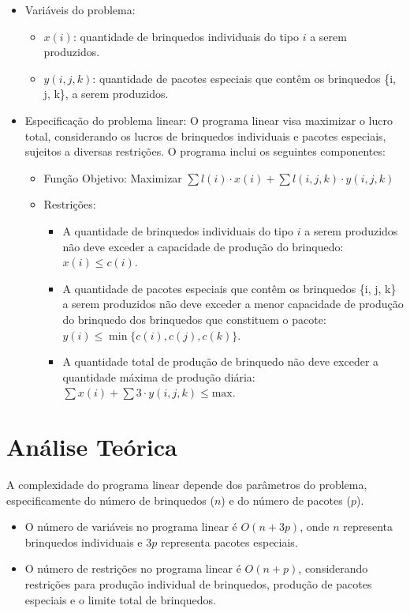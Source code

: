 \documentclass[12pt]{article}
\begin{document}
\begin{itemize}
    \item Variáveis do problema:
        \begin{itemize}
            \item $x(i)$: quantidade de brinquedos individuais do tipo $i$ a serem produzidos.
            \item $y(i, j, k)$: quantidade de pacotes especiais que contêm os brinquedos \{i, j, k\}, a serem produzidos.
        \end{itemize}
    \item Especificação do problema linear: O programa linear visa maximizar o lucro total, considerando os lucros de brinquedos individuais e pacotes especiais, sujeitos a diversas restrições. O programa inclui os seguintes componentes:
        \begin{itemize}
            \item Função Objetivo: Maximizar $\sum{l(i) \cdot x(i)} + \sum{l(i,j,k) \cdot y(i,j,k)}$
            \item Restrições:
                \begin{itemize}
                    \item A quantidade de brinquedos individuais do tipo $i$ a serem produzidos não deve exceder a capacidade de produção do brinquedo: $x(i) \leq c(i)$.
                    \item A quantidade de pacotes especiais que contêm os brinquedos \{i, j, k\} a serem produzidos não deve exceder a menor capacidade de produção do brinquedo dos brinquedos que constituem o pacote: $y(i) \leq \min\{c(i), c(j), c(k)\}$.
                    \item A quantidade total de produção de brinquedo não deve exceder a quantidade máxima de produção diária: $\sum{x(i)} + \sum{3 \cdot y(i,j,k)} \leq \text{max}$.
                \end{itemize}
        \end{itemize}
\end{itemize}

\section{Análise Teórica}

A complexidade do programa linear depende dos parâmetros do problema, especificamente do número de brinquedos ($n$) e do número de pacotes ($p$).

\begin{itemize}
    \item O número de variáveis no programa linear é $O(n+3p)$, onde $n$ representa brinquedos individuais e $3p$ representa pacotes especiais.
    \item O número de restrições no programa linear é $O(n+p)$, considerando restrições para produção individual de brinquedos, produção de pacotes especiais e o limite total de brinquedos.
\end{itemize}
\end{document}
